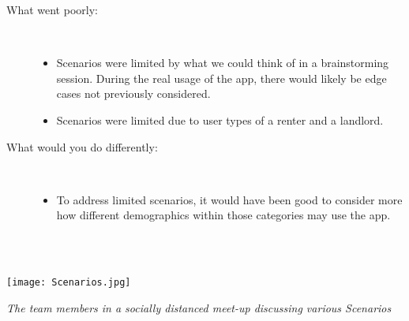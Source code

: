 \documentclass{article}
\begin{document}
\begin{description}
    \item[What went poorly:]
    \newline \,
    \begin{itemize}
        \item Scenarios were limited by what we could think of in a brainstorming session. During the 
        real usage of the app, there would likely be edge cases not previously considered.
        \item Scenarios were limited due to user types of a renter and a landlord. 
    \end{itemize}
    
    \item[What would you do differently:]
    \newline \,
    \begin{itemize}
        \item To address limited scenarios, it would have been good to consider more how different 
        demographics within those categories may use the app.
    \end{itemize}
\end{description}
\\~\\
\begin{center}
    \texttt{[image: Scenarios.jpg]}
\end{center}
\begin{center}
    \textit{The team members in a socially distanced meet-up discussing various Scenarios}
\end{center}
\end{document}
